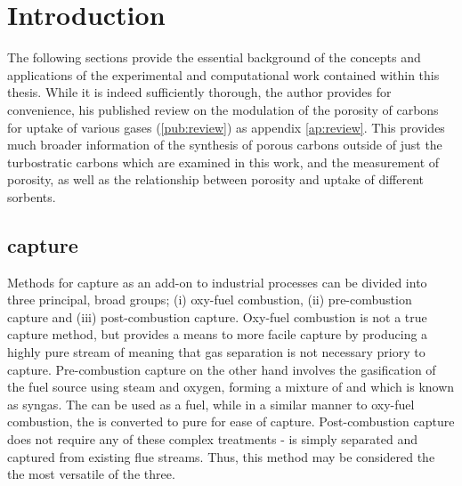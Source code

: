 \chapter{Introduction}
\label{ch:introduction}
The following sections provide the essential background of the concepts and applications of the experimental and computational work contained within this thesis. While it is indeed sufficiently thorough, the author provides for convenience, his published review on the modulation of the porosity of carbons for uptake of various gases (\ref{pub:review}) as appendix \ref{ap:review}. This provides much broader information of the synthesis of porous carbons outside of just the \glspl{turbostratic carbon} which are examined in this work, and the measurement of porosity, as well as the relationship between porosity and uptake of different sorbents. 

\newpage
\section{\texorpdfstring{ capture}{CO2 capture}}
\label{s:ccs}

Methods for  capture as an add-on to industrial processes can be divided into three principal, broad groups; (i) oxy-fuel combustion, (ii) pre-combustion capture and (iii) post-combustion capture.\citep{kanniche2010pre} Oxy-fuel combustion is not a true  capture method, but provides a means to more facile  capture by producing a highly pure stream of  meaning that gas separation is not necessary priory to capture.\citep{stanger2015oxyfuel, wall2009overview} Pre-combustion capture on the other hand involves the gasification of the fuel source using steam and oxygen, forming a mixture of  and  which is known as syngas. The  can be used as a fuel, while in a similar manner to oxy-fuel combustion, the  is converted to pure  for ease of capture.\citep{jansen2015pre} Post-combustion capture does not require any of these complex treatments -  is simply separated and captured from existing flue streams.\citep{wang2017review, samanta2012post} Thus, this method may be considered the the most versatile of the three.

